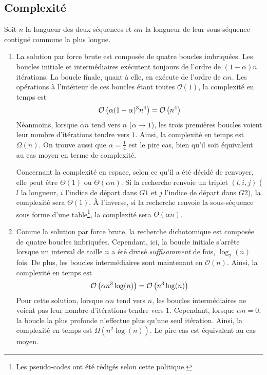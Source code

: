 \documentclass[a4paper, 12pt]{article}
\begin{document}
	\subsection{Complexité}
	Soit $n$ la longueur des deux séquences et $\alpha n$ la longueur de leur sous-séquence contiguë commune la plus longue.
	\begin{enumerate}[label=(\alph*)]
		\item La solution par force brute est composée de quatre boucles imbriquées. Les boucles initiale et intermédiaires exécutent toujours de l'ordre de $(1 - \alpha) n$ itérations. La boucle finale, quant à elle, en exécute de l'ordre de $\alpha n$. Les opérations à l'intérieur de ces boucles étant toutes $\mathcal{O}(1)$, la complexité en temps est
		\begin{equation}
			\mathcal{O}\left(\alpha (1 - \alpha)^3 n^4\right) = \mathcal{O}\left(n^4\right)
		\end{equation}
		Néanmoins, lorsque $\alpha n$ tend vers $n$ ($\alpha \to 1$), les trois premières boucles voient leur nombre d'itérations tendre vers $1$. Ainsi, la complexité en temps est $\Omega(n)$. On trouve aussi que $\alpha = \frac{1}{4}$ est le pire cas, bien qu'il soit équivalent au cas moyen en terme de complexité. \par
		Concernant la complexité en espace, selon ce qu'il a été décidé de renvoyer, elle peut être $\Theta(1)$ ou $\Theta(\alpha n)$. Si la recherche renvoie un triplet $(l,i,j)$ ($l$ la longueur, $i$ l'indice de départ dans $G1$ et $j$ l'indice de départ dans $G2$), la complexité sera $\Theta(1)$. À l'inverse, si la recherche renvoie la sous-séquence sous forme d'une table\footnote{Les pseudo-codes ont été rédigés selon cette politique.}, la complexité sera $\Theta(\alpha n)$.
		\item Comme la solution par force brute, la recherche dichotomique est composée de quatre boucles imbriquées. Cependant, ici, la boucle initiale s'arrête lorsque un interval de taille $n$ a été divisé \emph{suffisamment} de fois, \cad{} $\log_2(n)$ fois. De plus, les boucles intermédiaires sont maintenant en $\mathcal{O}(n)$. Ainsi, la complexité en temps est
		\begin{equation}
			\mathcal{O}\left(\alpha n^3 \log(n)\right) = \mathcal{O}\left(n^3 \log(n)\right)
		\end{equation}
		Pour cette solution, lorsque $\alpha n$ tend vers $n$, les boucles intermédiaires ne voient pas leur nombre d'itérations tendre vers $1$. Cependant, lorsque $\alpha n = 0$, la boucle la plus profonde n'effectue plus qu'une seul itération. Ainsi, la complexité en temps est $\Omega(n^2 \log(n))$. Le pire cas est équivalent au cas moyen. \par

\end{enumerate}
\end{document}
